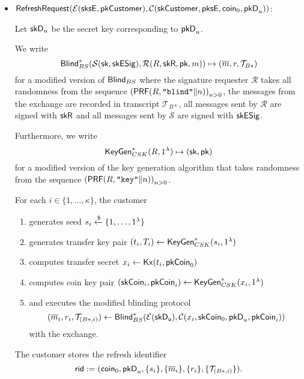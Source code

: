 \begin{itemize}
  \item $\mathsf{RefreshRequest}(\mathcal{E}(\mathsf{sksE}, \mathsf{pkCustomer}), \mathcal{C}(\mathsf{skCustomer}, \mathsf{pksE}, \mathsf{coin}_0, \mathsf{pkD}_u))$:

    Let $\mathsf{skD}_u$ be the secret key corresponding to $\mathsf{pkD}_u$.

    We write
    \[ \mathsf{Blind}^*_{BS}(\mathcal{S}(\mathsf{sk}, \mathsf{skESig}), \mathcal{R}(R, \mathsf{skR}, \mathsf{pk}, m)) \mapsto (\overline{m}, r, \mathcal{T}_{B*}) \]
    for a modified version of $\mathsf{Blind}_{BS}$ where the signature requester
    $\mathcal{R}$ takes all randomness from the sequence
    $\left(\mathsf{PRF}(R,\texttt{"blind"}\Vert n)\right)_{n>0}$, the messages from
    the exchange are recorded in transcript $\mathcal{T}_{B*}$, all
    messages sent by $\mathcal{R}$ are signed with $\mathsf{skR}$ and all messages sent by $\mathcal{S}$
    are signed with $\mathsf{skESig}$.

    Furthermore, we write \[ \mathsf{KeyGen}^*_{CSK}(R, 1^\lambda) \mapsto
    (\mathsf{sk}, \mathsf{pk}) \] for a modified version of the key generation algorithm
    that takes randomness from the sequence $\left(\mathsf{PRF}(R,\texttt{"key"}\Vert
    n)\right)_{n>0}$.

    For each $i\in \{1,\dots,\kappa \}$, the customer
    \begin{enumerate}
      \item generates seed $s_i \xleftarrow{\text{\$}} \{1, \dots, 1^\lambda\}$
      \item generates transfer key pair $(t_i, T_i) \leftarrow \mathsf{KeyGen}^*_{CSK}(s_i, 1^\lambda)$
      \item computes transfer secret $x_i \leftarrow \mathsf{Kx}(t_i, \mathsf{pkCoin}_0)$
      \item computes coin key pair $(\mathsf{skCoin}_i, \mathsf{pkCoin}_i) \leftarrow
        \mathsf{KeyGen}^*_{CSK}(x_i, 1^\lambda)$
      \item and executes the modified blinding protocol
      \[
        (\overline{m}_i, r_i, \mathcal{T}_{(B*,i)}) \leftarrow
          \mathsf{Blind}^*_{BS}(\mathcal{E}(\mathsf{skD_u}), \mathcal{C}(x_i, \mathsf{skCoin}_0, \mathsf{pkD}_u, \mathsf{pkCoin}_i))
      \]
        with the exchange.
    \end{enumerate}

    The customer stores the refresh identifier
    \begin{equation}
      \mathsf{rid} := (\mathsf{coin}_0, \mathsf{pkD}_u, \{ s_i \}, \{ \overline{m}_i \}, \{r_i\}, \{\mathcal{T}_{(B*,i)}\} ).
    \end{equation}


\end{itemize}
